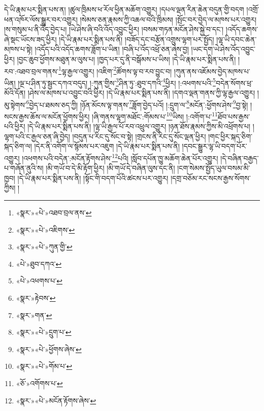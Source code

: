 དེ་ཡི་རྣམ་པར་སྨིན་པས་ན། །ཚུལ་ཁྲིམས་ཕ་རོལ་ཕྱིན་མཆོག་འགྱུར། །དཔལ་ལྡན་རིན་ཆེན་བདུན་གྱི་བདག །འགྲོ་ཕན་འཁོར་ལོས་སྒྱུར་བར་འགྱུར། །སེམས་ཅན་རྣམས་ཀྱི་འཆལ་བའི་ཁྲིམས། །སྤོང་བར་བྱེད་ལ་མཁས་པར་འགྱུར། །ས་གསུམ་པ་ནི་འོད་བྱེད་པ། །ཡེ་ཤེས་ཞི་བའི་འོད་འབྱུང་ཕྱིར། །བསམ་གཏན་མངོན་ཤེས་སྐྱེ་བ་དང་། །འདོད་ཆགས་ཞེ་སྡང་ཡོངས་ཟད་ཕྱིར། །དེ་ཡི་རྣམ་པར་སྨིན་པས་ནི། །བཟོད་དང་བརྩོན་འགྲུས་ལྷག་པར་སྤྱོད། །ལྷ་ཡི་དབང་ཆེན་མཁས་པ་སྟེ། །འདོད་པའི་འདོད་ཆགས་ཟློག་པ་ཡིན། །བཞི་པ་འོད་འཕྲོ་ཅན་ཞེས་བྱ། །ཡང་དག་ཡེ་ཤེས་འོད་འབྱུང་ཕྱིར། །བྱང་ཆུབ་ཕྱོགས་མཐུན་མ་ལུས་པ། །ཁྱད་པར་དུ་ནི་བསྒོམས་པ་ཡིས། །དེ་ཡི་རྣམ་པར་སྨིན་པས་ནི། །རབ་:འཐབ་བྲལ་གནས་\footnote{«སྣར་»«པེ་»འཐབ་བྲལ་ནས་}ལྷ་རྒྱལ་འགྱུར། །འཇིག་\footnote{«སྣར་»«པེ་»འཇིགས་}ཚོགས་ལྟ་བ་རབ་བྱུང་བ། །ཀུན་ནས་འཇོམས་བྱེད་མཁས་པ་ཡིན། །ལྔ་པ་ཤིན་ཏུ་སྦྱང་དཀའ་བདུད། །:ཀུན་གྱིས་\footnote{«སྣར་»«པེ་»ཀུན་གྱི་}ཤིན་ཏུ་:ཐུབ་དཀའི་\footnote{«པེ་»ཐུབ་དཀའ་}ཕྱིར། །:འཕགས་པའི་\footnote{«པེ་»འཕགས་པ་}བདེན་སོགས་ཕྲ་མོའི་དོན། །ཤེས་ལ་མཁས་པ་འབྱུང་བའི་ཕྱིར། །དེ་ཡི་རྣམ་པར་སྨིན་པས་ནི། །དགའ་ལྡན་གནས་ཀྱི་ལྷ་རྒྱལ་འགྱུར། །མུ་སྟེགས་\footnote{«སྣར་»རྟེབས་}བྱེད་པ་ཐམས་ཅད་ཀྱི། །ཉོན་མོངས་ལྟ་གནས་\footnote{«སྣར་»གན་}ཟློག་བྱེད་པའོ། །:དྲུག་ལ་\footnote{«སྣར་»«པེ་»དྲུག་པ་}མངོན་:ཕྱོགས་ཤེས་\footnote{«སྣར་»«པེ་»ཕྱོགས་ཞེས་}བྱ་སྟེ། །སངས་རྒྱས་ཆོས་ལ་མངོན་ཕྱོགས་ཕྱིར། །ཞི་གནས་ལྷག་མཐོང་:གོམས་པ་\footnote{«སྣར་»«པེ་»གོམ་པ་}ཡིས། །:འགོག་པ་\footnote{«ཅོ་»འགོགས་པ་}ཐོབ་པས་རྒྱས་པའི་ཕྱིར། །དེ་ཡི་རྣམ་པར་སྨིན་པས་ནི། །ལྷ་ཡི་རྒྱལ་པོ་རབ་འཕྲུལ་འགྱུར། །ཉན་ཐོས་རྣམས་ཀྱིས་མི་འཕྲོགས་པ། །ལྷག་པའི་ང་རྒྱལ་ཅན་ཞི་བྱེད། །བདུན་པ་རིང་དུ་སོང་བ་སྟེ། །གྲངས་ནི་རིང་དུ་སོང་ལྡན་ཕྱིར། །གང་ཕྱིར་སྐད་ཅིག་སྐད་ཅིག་ལ། །དེར་ནི་འགོག་ལ་སྙོམས་པར་འཇུག །དེ་ཡི་རྣམ་པར་སྨིན་པས་ནི། །དབང་སྒྱུར་ལྷ་ཡི་བདག་པོར་འགྱུར། །འཕགས་པའི་བདེན་:མངོན་རྟོགས་ཤེས་\footnote{«སྣར་»«པེ་»མངོན་རྟོགས་ཞེས་}པའི། །སློབ་དཔོན་ཁྱུ་མཆོག་ཆེན་པོར་འགྱུར། །དེ་བཞིན་བརྒྱད་པ་གཞོན་ནུའི་ས། །མི་གཡོ་བ་དེ་མི་རྟོག་ཕྱིར། །མི་གཡོ་དེ་བཞིན་ལུས་དང་ནི། །ངག་སེམས་སྤྱོད་ཡུལ་བསམ་མི་ཁྱབ། །དེ་ཡི་རྣམ་པར་སྨིན་པས་ནི། །སྟོང་གི་བདག་པོའི་ཚངས་པར་འགྱུར། །དགྲ་བཅོམ་རང་སངས་རྒྱས་སོགས་ཀྱིས། །
